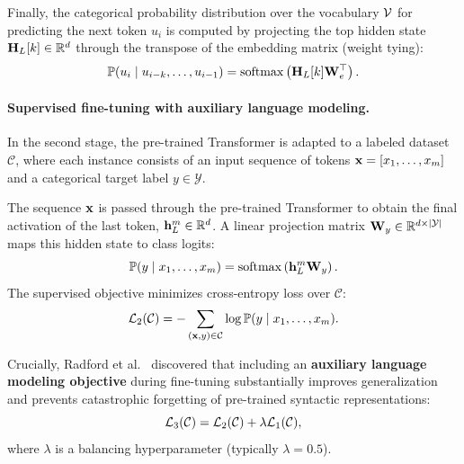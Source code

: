\documentclass[../../main.tex]{subfiles}
\begin{document}
Finally, the categorical probability distribution over the vocabulary $\mathcal{V}$ for predicting the next token $u_i$ is computed by projecting the top hidden state $\mathbf{H}_L[k] \in \mathbb{R}^d$ through the transpose of the embedding matrix (weight tying):
\begin{equation}
\label{eq:gpt1_output_prob}
\mathbb{P}(u_i \mid u_{i-k}, \dots, u_{i-1}) = \operatorname{\mathrm{softmax}}\left( \mathbf{H}_L[k] \mathbf{W}_e^\top \right).
\end{equation}

\paragraph{Supervised fine-tuning with auxiliary language modeling.}
In the second stage, the pre-trained Transformer is adapted to a labeled dataset $\mathcal{C}$, where each instance consists of an input sequence of tokens $\mathbf{x} = [x_1, \dots, x_m]$ and a categorical target label $y \in \mathcal{Y}$.

The sequence $\mathbf{x}$ is passed through the pre-trained Transformer to obtain the final activation of the last token, $\mathbf{h}_L^m \in \mathbb{R}^d$. A linear projection matrix $\mathbf{W}_y \in \mathbb{R}^{d \times |\mathcal{Y}|}$ maps this hidden state to class logits:
\begin{equation}
\label{eq:gpt1_supervised_prob}
\mathbb{P}(y \mid x_1, \dots, x_m) = \operatorname{\mathrm{softmax}}\left( \mathbf{h}_L^m \mathbf{W}_y \right).
\end{equation}
The supervised objective minimizes cross-entropy loss over $\mathcal{C}$:
\begin{equation}
\label{eq:gpt1_supervised_loss}
\mathcal{L}_2(\mathcal{C}) = -\sum_{(\mathbf{x}, y) \in \mathcal{C}} \log \mathbb{P}(y \mid x_1, \dots, x_m).
\end{equation}

Crucially, Radford et al.~\cite{radford2018} discovered that including an \textbf{auxiliary language modeling objective} during fine-tuning substantially improves generalization and prevents catastrophic forgetting of pre-trained syntactic representations:
\begin{equation}
\label{eq:gpt1_joint_loss}
\mathcal{L}_3(\mathcal{C}) = \mathcal{L}_2(\mathcal{C}) + \lambda \mathcal{L}_1(\mathcal{C}),
\end{equation}
where $\lambda$ is a balancing hyperparameter (typically $\lambda = 0.5$).
\end{document}
